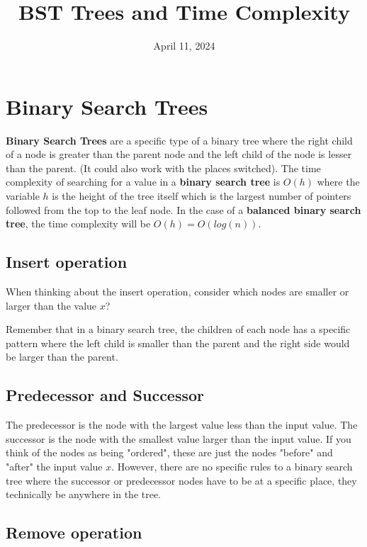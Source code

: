 \documentclass[11pt,a4paper,english]{article}
\begin{document}
\title{BST Trees and Time Complexity}
\date{April 11, 2024}
\maketitle

\tableofcontents
\section{Binary Search Trees}

\textbf{Binary Search Trees} are a specific type of a binary tree where the right child of a node is greater than the parent node and the left child of the node is lesser than the parent. (It could also work with the places switched). The time complexity of searching for a value in a \textbf{binary search tree} is $O(h)$ where the variable $h$ is the height of the tree itself which is the largest number of pointers followed from the top to the leaf node. In the case of a \textbf{balanced binary search tree}, the time complexity will be $O(h) = O(log(n))$.

\subsection{Insert operation}

When thinking about the insert operation, consider which nodes are smaller or larger than the value $x$?
\bigskip

Remember that in a binary search tree, the children of each node has a specific pattern where the left child is smaller than the parent and the right side would be larger than the parent.

\subsection{Predecessor and Successor}

The predecessor is the node with the largest value less than the input value. The successor is the node with the smallest value larger than the input value. If you think of the nodes as being "ordered", these are just the nodes "before" and "after" the input value $x$. However, there are no specific rules to a binary search tree where the successor or predecessor nodes have to be at a specific place, they technically be anywhere in the tree.

\subsection{Remove operation}
\end{document}
